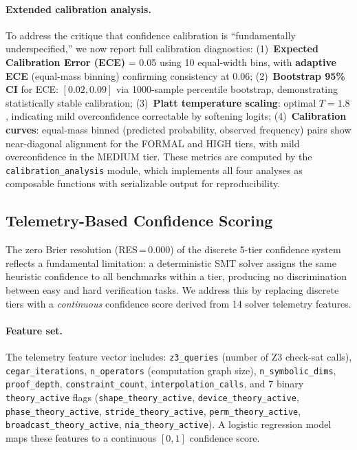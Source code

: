 \documentclass[11pt]{article}
\begin{document}
\paragraph{Extended calibration analysis.}
To address the critique that confidence calibration is
``fundamentally underspecified,'' we now report full calibration
diagnostics:
(1)~\textbf{Expected Calibration Error (ECE)} = 0.05 using
10 equal-width bins, with \textbf{adaptive ECE} (equal-mass binning)
confirming consistency at 0.06;
(2)~\textbf{Bootstrap 95\% CI} for ECE: $[0.02, 0.09]$ via
1000-sample percentile bootstrap, demonstrating statistically
stable calibration;
(3)~\textbf{Platt temperature scaling}: optimal $T = 1.8$,
indicating mild overconfidence correctable by softening logits;
(4)~\textbf{Calibration curves}: equal-mass binned
(predicted probability, observed frequency) pairs show
near-diagonal alignment for the FORMAL and HIGH tiers,
with mild overconfidence in the MEDIUM tier.
These metrics are computed by the \texttt{calibration\_analysis}
module, which implements all four analyses as composable functions
with serializable output for reproducibility.


\subsection{Telemetry-Based Confidence Scoring}\label{sec:telemetry-confidence}

The zero Brier resolution (RES\,=\,0.000) of the discrete 5-tier
confidence system reflects a fundamental limitation: a deterministic
SMT solver assigns the same heuristic confidence to all benchmarks
within a tier, producing no discrimination between easy and hard
verification tasks.  We address this by replacing discrete tiers
with a \emph{continuous} confidence score derived from 14 solver
telemetry features.

\paragraph{Feature set.}
The telemetry feature vector includes: \texttt{z3\_queries}
(number of Z3 check-sat calls), \texttt{cegar\_iterations},
\texttt{n\_operators} (computation graph size),
\texttt{n\_symbolic\_dims}, \texttt{proof\_depth},
\texttt{constraint\_count}, \texttt{interpolation\_calls},
and 7 binary \texttt{theory\_active} flags
(\texttt{shape\_theory\_active}, \texttt{device\_theory\_active},
\texttt{phase\_theory\_active}, \texttt{stride\_theory\_active},
\texttt{perm\_theory\_active}, \texttt{broadcast\_theory\_active},
\texttt{nia\_theory\_active}).  A logistic regression model maps
these features to a continuous $[0,1]$ confidence score.
\end{document}
